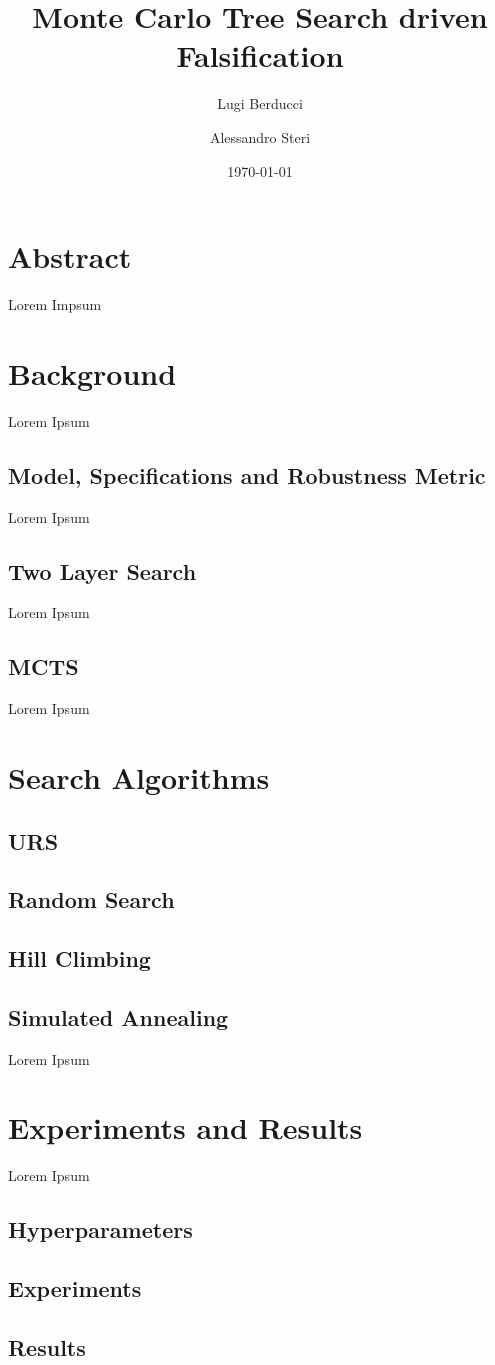 \documentclass[11pt]{article}
\title{ Monte Carlo Tree Search driven Falsification }
\author{ Lugi Berducci \and Alessandro Steri }
\date{\today}
\begin{document}
\maketitle	
\pagebreak

\tableofcontents
\pagebreak


\section{ Abstract }
Lorem Impsum
\pagebreak

\section{ Background }
Lorem Ipsum \\
\pagebreak

\subsection{ Model, Specifications and Robustness Metric }
Lorem Ipsum \\

\subsection{ Two Layer Search }
Lorem Ipsum \\

\subsection{ MCTS }
Lorem Ipsum \\
\pagebreak

\section{ Search Algorithms }
\subsection{ URS }
\subsection{ Random Search }
\subsection{ Hill Climbing }
\subsection{ Simulated Annealing }
Lorem Ipsum \\
\pagebreak

\section{ Experiments and Results }
Lorem Ipsum \\

\subsection{ Hyperparameters }
\subsection{ Experiments }
\subsection{ Results }
\pagebreak
\end{document}
